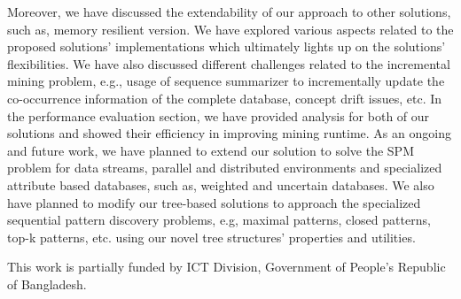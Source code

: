 Moreover, we have discussed the extendability of our approach to other solutions, such as, memory resilient version. We have explored various aspects related to the proposed solutions' implementations which ultimately lights up on the solutions' flexibilities. We have also discussed different challenges related to the incremental mining problem, e.g., usage of sequence summarizer to incrementally update the co-occurrence information of the complete database, concept drift issues, etc. In the performance evaluation section, we have provided analysis for both of our solutions and showed their efficiency in improving mining runtime. As an ongoing and future work, we have planned to extend our solution to solve the SPM problem for data streams, parallel and distributed environments and specialized attribute based databases, such as, weighted and uncertain databases. We also have planned to modify our tree-based solutions to approach the specialized sequential pattern discovery problems, e.g, maximal patterns, closed patterns, top-k patterns, etc. using our novel tree structures' properties and utilities.  

\begin{acknowledgements}
This work is partially funded by ICT Division, Government of People’s Republic of Bangladesh.
\end{acknowledgements}

%

%
%
%
  

%
%



